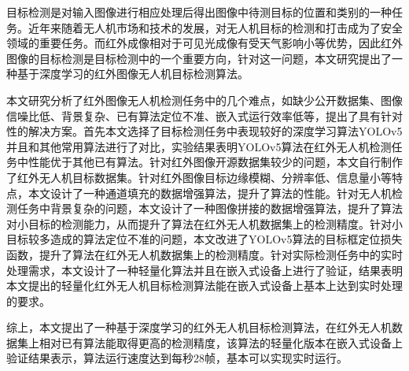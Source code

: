 \begin{cabstract}
  目标检测是对输入图像进行相应处理后得出图像中待测目标的位置和类别的一种任务。近年来随着无人机市场和技术的发展，对无人机目标的检测和打击成为了安全领域的重要任务。而红外成像相对于可见光成像有受天气影响小等优势，因此红外图像的目标检测是目标检测中的一个重要方向，针对这一问题，本文研究提出了一种基于深度学习的红外图像无人机目标检测算法。

本文研究分析了红外图像无人机检测任务中的几个难点，如缺少公开数据集、图像信噪比低、背景复杂、已有算法定位不准、嵌入式运行效率低等，提出了具有针对性的解决方案。首先本文选择了目标检测任务中表现较好的深度学习算法YOLOv5并且和其他常用算法进行了对比，实验结果表明YOLOv5算法在红外无人机检测任务中性能优于其他已有算法。针对红外图像开源数据集较少的问题，本文自行制作了红外无人机目标数据集。针对红外图像目标边缘模糊、分辨率低、信息量小等特点，本文设计了一种通道填充的数据增强算法，提升了算法的性能。针对无人机检测任务中背景复杂的问题，本文设计了一种图像拼接的数据增强算法，提升了算法对小目标的检测能力，从而提升了算法在红外无人机数据集上的检测精度。针对小目标较多造成的算法定位不准的问题，本文改进了YOLOv5算法的目标框定位损失函数，提升了算法在红外无人机数据集上的检测精度。针对实际检测任务中的实时处理需求，本文设计了一种轻量化算法并且在嵌入式设备上进行了验证，结果表明本文提出的轻量化红外无人机目标检测算法能在嵌入式设备上基本上达到实时处理的要求。

综上，本文提出了一种基于深度学习的红外无人机目标检测算法，在红外无人机数据集上相对已有算法能取得更高的检测精度，该算法的轻量化版本在嵌入式设备上验证结果表示，算法运行速度达到每秒28帧，基本可以实现实时运行。
\end{cabstract}

